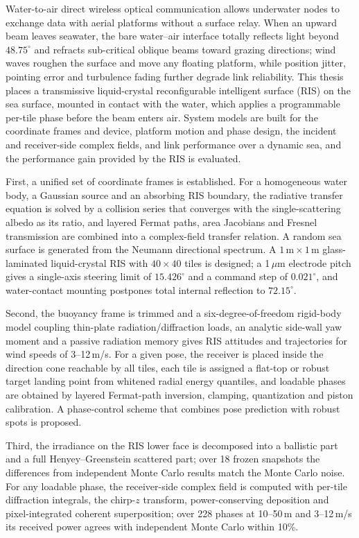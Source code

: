 \begin{englishabstract}
Water-to-air direct wireless optical communication allows underwater nodes to exchange data with aerial platforms without a surface relay. When an upward beam leaves seawater, the bare water--air interface totally reflects light beyond $48.75^\circ$ and refracts sub-critical oblique beams toward grazing directions; wind waves roughen the surface and move any floating platform, while position jitter, pointing error and turbulence fading further degrade link reliability. This thesis places a transmissive liquid-crystal reconfigurable intelligent surface (RIS) on the sea surface, mounted in contact with the water, which applies a programmable per-tile phase before the beam enters air. System models are built for the coordinate frames and device, platform motion and phase design, the incident and receiver-side complex fields, and link performance over a dynamic sea, and the performance gain provided by the RIS is evaluated.

First, a unified set of coordinate frames is established. For a homogeneous water body, a Gaussian source and an absorbing RIS boundary, the radiative transfer equation is solved by a collision series that converges with the single-scattering albedo as its ratio, and layered Fermat paths, area Jacobians and Fresnel transmission are combined into a complex-field transfer relation. A random sea surface is generated from the Neumann directional spectrum. A $1\,\mathrm m\times1\,\mathrm m$ glass-laminated liquid-crystal RIS with $40\times40$ tiles is designed; a 1\,$\mu$m electrode pitch gives a single-axis steering limit of $15.426^\circ$ and a command step of $0.021^\circ$, and water-contact mounting postpones total internal reflection to $72.15^\circ$.

Second, the buoyancy frame is trimmed and a six-degree-of-freedom rigid-body model coupling thin-plate radiation/diffraction loads, an analytic side-wall yaw moment and a passive radiation memory gives RIS attitudes and trajectories for wind speeds of 3--12\,m/s. For a given pose, the receiver is placed inside the direction cone reachable by all tiles, each tile is assigned a flat-top or robust target landing point from whitened radial energy quantiles, and loadable phases are obtained by layered Fermat-path inversion, clamping, quantization and piston calibration. A phase-control scheme that combines pose prediction with robust spots is proposed.

Third, the irradiance on the RIS lower face is decomposed into a ballistic part and a full Henyey--Greenstein scattered part; over 18 frozen snapshots the differences from independent Monte Carlo results match the Monte Carlo noise. For any loadable phase, the receiver-side complex field is computed with per-tile diffraction integrals, the chirp-$z$ transform, power-conserving deposition and pixel-integrated coherent superposition; over 228 phases at 10--50\,m and 3--12\,m/s its received power agrees with independent Monte Carlo within 10\%.


\end{englishabstract}
